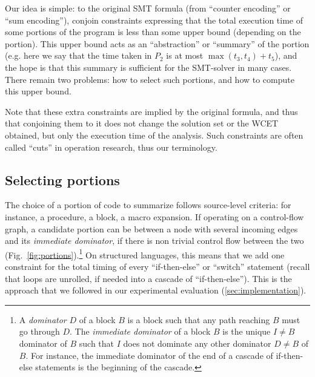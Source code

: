 \documentclass[a4paper,twocolumn,11pt]{article}
\begin{document}
Our idea is simple: to the original SMT formula (from ``counter encoding'' or ``sum encoding''), conjoin constraints expressing that the total execution time of some portions of the program is less than some upper bound (depending on the portion). This upper bound acts as an ``abstraction'' or ``summary'' of the portion (e.g. here we say that the time taken in $P_2$ is at most $ \max(t_3, t_4) + t_5$), and the hope is that this summary is sufficient for the SMT-solver in many cases. There remain two problems: how to select such portions, and how to compute this upper bound.

Note that these extra constraints are implied by the original formula, and thus that conjoining them to it does not change the solution set or the WCET obtained, but only the execution time of the analysis. Such constraints are often called ``cuts'' in operation research, thus our terminology.

\subsection{Selecting portions}

The choice of a portion of code to summarize follows source-level criteria: for instance, a procedure, a block, a macro expansion.
If operating on a control-flow graph, a candidate portion can be between a node with several incoming edges and its \emph{immediate dominator}, if there is non trivial control flow between the two (Fig.~\ref{fig:portions}).\footnote{A \emph{dominator} $D$ of a block $B$ is a block such that any path reaching $B$ must go through $D$. The \emph{immediate dominator} of a block $B$ is the unique $I \neq B$ dominator of $B$ such that $I$ does not dominate any other dominator $D \neq B$ of $B$. For instance, the immediate dominator of the end of a cascade of if-then-else statements is the beginning of the cascade.}
On structured languages, this means that we add one constraint for the total timing of every ``if-then-else'' or ``switch'' statement (recall that loops are unrolled, if needed into a cascade of ``if-then-else'').
This is the approach that we followed in our experimental evaluation (\autoref{sec:implementation}).
\end{document}
